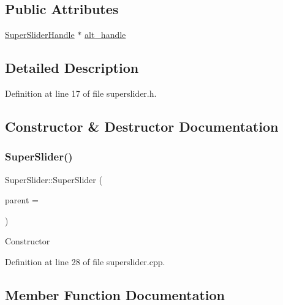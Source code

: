 \subsection*{Public Attributes}
\begin{DoxyCompactItemize}
\item 
\hyperlink{class_super_slider_handle}{Super\+Slider\+Handle} $\ast$ \hyperlink{class_super_slider_ab9914dbeb1d49ddb7e4c0309477189a8}{alt\+\_\+handle}
\end{DoxyCompactItemize}


\subsection{Detailed Description}


Definition at line 17 of file superslider.\+h.



\subsection{Constructor \& Destructor Documentation}
\mbox{\label{class_super_slider_a1ced83868e54ebc4cf04bd16839c63be}} 
\subsubsection{\texorpdfstring{Super\+Slider()}{SuperSlider()}}
{\footnotesize\ttfamily Super\+Slider\+::\+Super\+Slider (\begin{DoxyParamCaption}\item[{Q\+Widget $\ast$}]{parent = {} }\end{DoxyParamCaption})}

Constructor 

Definition at line 28 of file superslider.\+cpp.



\subsection{Member Function Documentation}
\mbox{\label{class_super_slider_a1f6984cb59675c75c7c556f596fea804}} 
